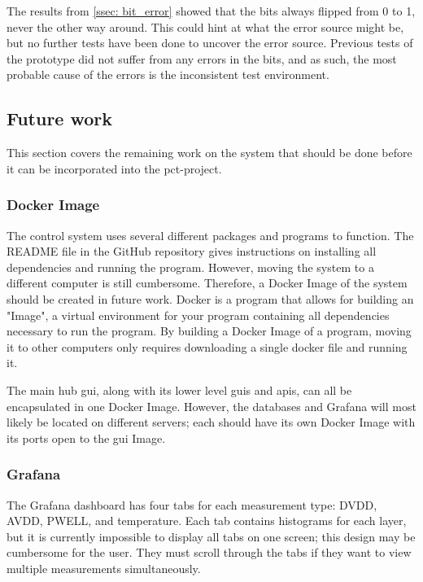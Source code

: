 \documentclass[main.tex]{subfiles}
\begin{document}
The results from \autoref{ssec: bit_error} showed that the bits always flipped from 0 to 1, never the other way around. This could hint at what the error source might be, but no further tests have been done to uncover the error source. Previous tests of the prototype did not suffer from any errors in the bits, and as such, the most probable cause of the errors is the inconsistent test environment.

\subsection{Future work}

This section covers the remaining work on the system that should be done before it can be incorporated into the \gls{pct}-project.

\subsubsection{Docker Image}
 
The control system uses several different packages and programs to function. The README file in the GitHub repository gives instructions on installing all dependencies and running the program. However, moving the system to a different computer is still cumbersome. Therefore, a Docker Image of the system should be created in future work. Docker is a program that allows for building an "Image", a virtual environment for your program containing all dependencies necessary to run the program. By building a Docker Image of a program, moving it to other computers only requires downloading a single docker file and running it.
 
 The main hub \gls{gui}, along with its lower level \gls{gui}s and \gls{api}s, can all be encapsulated in one Docker Image. However, the databases and Grafana will most likely be located on different servers; each should have its own Docker Image with its ports open to the \gls{gui} Image.

\subsubsection{Grafana}

The Grafana dashboard has four tabs for each measurement type: DVDD, AVDD, PWELL, and temperature. Each tab contains histograms for each layer, but it is currently impossible to display all tabs on one screen; this design may be cumbersome for the user. They must scroll through the tabs if they want to view multiple measurements simultaneously.
\end{document}
